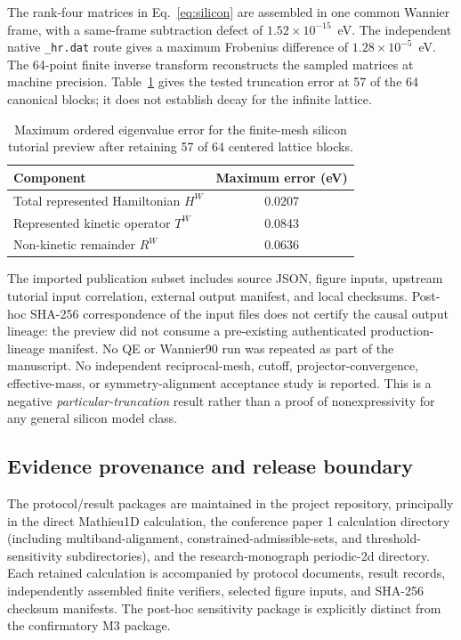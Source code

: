 \documentclass[11pt]{article}
\begin{document}
The rank-four matrices in Eq.~\eqref{eq:silicon} are assembled in one common Wannier frame, with a same-frame subtraction defect of $1.52\times10^{-15}$~eV. The independent native \texttt{\_hr.dat} route gives a maximum Frobenius difference of $1.28\times10^{-5}$~eV. The 64-point finite inverse transform reconstructs the sampled matrices at machine precision. Table~\ref{tab:silicon} gives the tested truncation error at 57 of the 64 canonical blocks; it does not establish decay for the infinite lattice.
\begin{table}[htbp]\centering\small
\caption{Maximum ordered eigenvalue error for the finite-mesh silicon tutorial preview after retaining 57 of 64 centered lattice blocks.}\label{tab:silicon}
\begin{tabular}{lc}\toprule Component & Maximum error (eV)\\\midrule
Total represented Hamiltonian $H^W$ & 0.0207\\
Represented kinetic operator $T^W$ & 0.0843\\
Non-kinetic remainder $R^W$ & 0.0636\\\bottomrule\end{tabular}
\end{table}
The imported publication subset includes source JSON, figure inputs, upstream tutorial input correlation, external output manifest, and local checksums. Post-hoc SHA-256 correspondence of the input files does not certify the causal output lineage: the preview did not consume a pre-existing authenticated production-lineage manifest. No QE or Wannier90 run was repeated as part of the manuscript. No independent reciprocal-mesh, cutoff, projector-convergence, effective-mass, or symmetry-alignment acceptance study is reported. This is a negative \emph{particular-truncation} result rather than a proof of nonexpressivity for any general silicon model class.

\subsection{Evidence provenance and release boundary}
The protocol/result packages are maintained in the project repository, principally in the direct Mathieu1D calculation, the conference paper 1 calculation directory (including multiband-alignment, constrained-admissible-sets, and threshold-sensitivity subdirectories), and the research-monograph periodic-2d directory. Each retained calculation is accompanied by protocol documents, result records, independently assembled finite verifiers, selected figure inputs, and SHA-256 checksum manifests. The post-hoc sensitivity package is explicitly distinct from the confirmatory M3 package.
\end{document}
